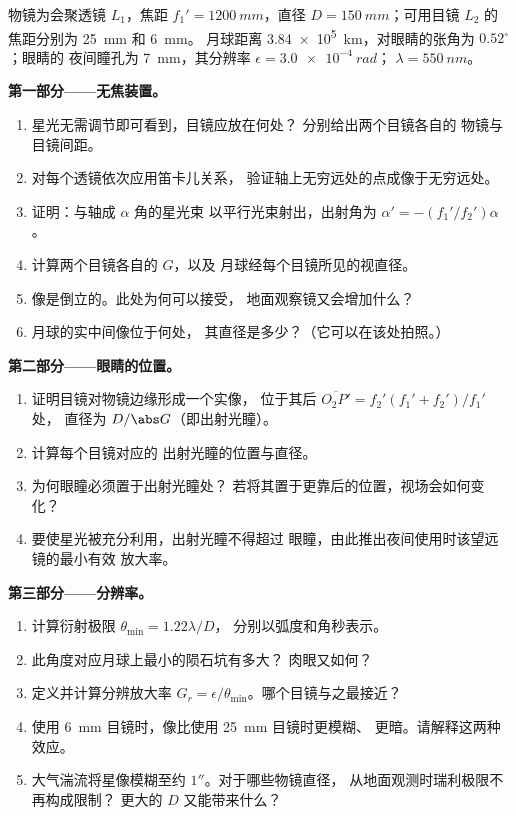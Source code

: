 \begin{problem}
\label{pb:b1:optical-instruments:1}
物镜为会聚透镜 $L_1$，焦距
$f_1' = \qty{1200}{mm}$，直径 $D = \qty{150}{mm}$；可用目镜
$L_2$ 的焦距分别为 \qty{25}{mm} 和 \qty{6}{mm}。
月球距离 \qty{3.84e5}{km}，对眼睛的张角为 $0.52^\circ$；眼睛的
夜间瞳孔为 \qty{7}{mm}，其分辨率 $\epsilon = \qty{3.0e-4}{rad}$；
$\lambda = \qty{550}{nm}$。

\medskip
\noindent\textbf{第一部分——无焦装置。}
\begin{enumerate}
  \item 星光无需调节即可看到，目镜应放在何处？
        分别给出两个目镜各自的
        物镜与目镜间距。
  \item 对每个透镜依次应用笛卡儿关系，
        验证轴上无穷远处的点成像于无穷远处。
  \item 证明：与轴成 $\alpha$ 角的星光束
        以平行光束射出，出射角为 $\alpha' = -(f_1'/f_2')\alpha$。
  \item 计算两个目镜各自的 $G$，以及
        月球经每个目镜所见的视直径。
  \item 像是倒立的。此处为何可以接受，
        地面观察镜又会增加什么？
  \item 月球的实中间像位于何处，
        其直径是多少？（它可以在该处拍照。）
\end{enumerate}

\medskip
\noindent\textbf{第二部分——眼睛的位置。}
\begin{enumerate}[resume]
  \item 证明目镜对物镜边缘形成一个实像，
        位于其后 $\overline{O_2P'} = f_2'(f_1' + f_2')/f_1'$ 处，
        直径为 $D/\abs G$（即出射光瞳）。
  \item 计算每个目镜对应的
        出射光瞳的位置与直径。
  \item 为何眼瞳必须置于出射光瞳处？
        若将其置于更靠后的位置，视场会如何变化？
  \item 要使星光被充分利用，出射光瞳不得超过
        眼瞳，由此推出夜间使用时该望远镜的最小有效
        放大率。
\end{enumerate}

\medskip
\noindent\textbf{第三部分——分辨率。}
\begin{enumerate}[resume]
  \item 计算衍射极限 $\theta_{\min} = 1.22\lambda/D$，
        分别以弧度和角秒表示。
  \item 此角度对应月球上最小的陨石坑有多大？
        肉眼又如何？
  \item 定义并计算分辨放大率 $G_r =
        \epsilon/\theta_{\min}$。哪个目镜与之最接近？
  \item 使用 \qty{6}{mm} 目镜时，像比使用 \qty{25}{mm} 目镜时更模糊、
        更暗。请解释这两种效应。
  \item 大气湍流将星像模糊至约 $1''$。对于哪些物镜直径，
        从地面观测时瑞利极限不再构成限制？
        更大的 $D$ 又能带来什么？
\end{enumerate}


\end{problem}
